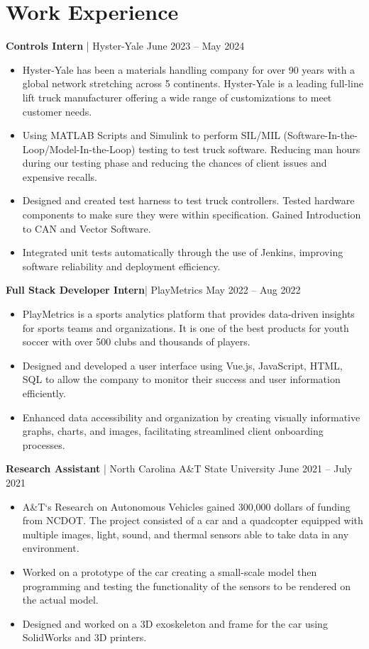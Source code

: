 \documentclass[letterpaper,10pt]{article}
\begin{document}
\section*{Work Experience}
\noindent \textbf{Controls Intern} | Hyster-Yale \hfill June 2023 – May 2024
\begin{itemize}[leftmargin=*,itemsep=0pt,topsep=0pt]
    \item Hyster-Yale has been a materials handling company for over 90 years with a global network stretching across 5 continents. Hyster-Yale is a leading full-line lift truck manufacturer offering a wide range of customizations to meet customer needs.
    \item Using MATLAB Scripts and Simulink to perform SIL/MIL (Software-In-the-Loop/Model-In-the-Loop) testing to test truck software. Reducing man hours during our testing phase and reducing the chances of client issues and expensive recalls.
    \item Designed and created test harness to test truck controllers. Tested hardware components to make sure they were within specification. Gained Introduction to CAN and Vector Software.
    \item Integrated unit tests automatically through the use of Jenkins, improving software reliability and deployment efficiency.
\end{itemize}
\noindent \textbf{Full Stack Developer Intern}| PlayMetrics \hfill May 2022 – Aug 2022
\begin{itemize}[leftmargin=*,itemsep=0pt,topsep=0pt]
    \item PlayMetrics is a sports analytics platform that provides data-driven insights for sports teams and organizations. It is one of the best products for youth soccer with over 500 clubs and thousands of players.
    \item Designed and developed a user interface using Vue.js, JavaScript, HTML, SQL to allow the company to monitor their success and user information efficiently.
    \item Enhanced data accessibility and organization by creating visually informative graphs, charts, and images, facilitating streamlined client onboarding processes.
\end{itemize}

\noindent \textbf{Research Assistant} | North Carolina A\&T State University \hfill June 2021 – July 2021
\begin{itemize}[leftmargin=*,itemsep=0pt,topsep=0pt]
    \item A\&T`s Research on Autonomous Vehicles gained 300,000 dollars of funding from NCDOT. The project consisted of a car and a quadcopter equipped with multiple images, light, sound, and thermal sensors able to take data in any environment.
    \item Worked on a prototype of the car creating a small-scale model then programming and testing the functionality of the sensors to be rendered on the actual model.
    \item Designed and worked on a 3D exoskeleton and frame for the car using SolidWorks and 3D printers.
\end{itemize}
\end{document}

